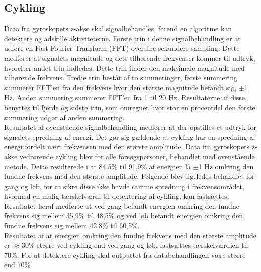 \subsection{Cykling}
Data fra gyroskopets z-akse skal signalbehandles, førend en algoritme kan detektere og adskille aktiviteterne. Første trin i denne signalbehandling er at udføre en Fast Fourier Transform (FFT) over fire sekunders sampling. Dette medfører at signalets magnitude og dets tilhørende frekvenser kommer til udtryk, hvorefter andet trin indledes. Dette trin finder den maksimale magnitude med tilhørende frekvens. Tredje trin består af to summeringer, første summering summerer FFT'en fra den frekvens hvor den største magnitude befandt sig, $\pm$1 Hz. Anden summering summerer FFT'en fra 1 til 20 Hz. Resultaterne af disse, benyttes til fjerde og sidste trin, som omregner hvor stor en procentdel den første summering udgør af anden summering. \\
Resultatet af ovenstående signalbehandling medfører at der opstilles et udtryk for signalets spredning af energi. Det gør sig gældende at cykling har en spredning af energi fordelt nært frekvensen med den største amplitude. Data fra gyroskopets z-akse vedrørende cykling blev for alle forsøgspersoner, behandlet med ovenstående metode. Dette resulterede i at 84,5\% til 91,9\% af energien lå $\pm$1 Hz omkring den fundne frekvens med den største amplitude. Følgende blev ligeledes behandlet for gang og løb, for at sikre disse ikke havde samme spredning i frekvensområdet, hvormed en mulig tærskelværdi til detektering af cykling, kan fastsættes. Resultatet heraf medførte at ved gang befandt energien omkring den fundne frekvens sig mellem 35,9\% til 48,5\% og ved løb befandt energien omkring den fundne frekvens sig mellem 42,8\% til 60,5\%. \\
Resultatet af at energien omkring den fundne frekvens med den største amplitude er $\approx$30\% større ved cykling end ved gang og løb, fastsættes tærskelværdien til 70\%. For at detektere cykling skal outputtet fra databehandlingen være større end 70\%.

